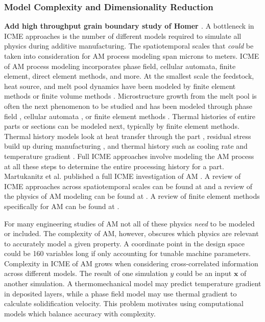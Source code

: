 \subsubsection{Model Complexity and Dimensionality Reduction}
\textbf{Add high throughput grain boundary study of Homer \cite{Homer2019}}. 
A bottleneck in ICME approaches is the number of different models required to simulate all physics during additive manufacturing. The spatiotemporal scales that \textit{could} be taken into consideration for AM process modeling span microns to meters. ICME of AM process modeling incorporates phase field, cellular automata, finite element, direct element methods, and more. At the smallest scale the feedstock, heat source, and melt pool dynamics have been modeled by finite element methods \cite{Toyserkani2004, Khairallah2016, Manvatkar2014} or finite  volume methods \cite{Dai2014}. Microstructure growth from the melt pool is often the next phenomenon to be studied and has been modeled through phase field \cite{Chen2002, Gong2015, Kundin2015, Sahoo2016}, cellular automata \cite{Tan2011}, or finite element methods \cite{Nie2014}. Thermal histories of entire parts or sections can be modeled next, typically by finite element methods. Thermal history models look at heat transfer through the part \cite{Michaleris2014}, residual stress build up during manufacturing \cite{Pal2014, Ding2011}, and thermal history such as cooling rate and temperature gradient \cite{Li2014, Raghavan2016}. Full ICME approaches involve modeling the AM process at all these steps to determine the entire processing history for a part. Martukanitz et al. published a full ICME investigation of AM \cite{Martukanitz2014}. A review of ICME approaches across spatiotemporal scales can be found at \cite{Francois2017} and a review of the physics of AM modeling can be found at \cite{King2015a}. A review of finite element methods specifically for AM can be found at \cite{Gouge2018}. 

For many engineering studies of AM not all of these physics \textit{need} to be modeled or included. The complexity of AM, however, obscures which physics are relevant to accurately model a given property. A coordinate point in the design space could be 160 variables long if only accounting for tunable machine parameters. Complexity in ICME of AM grows when considering cross-correlated information across different models. The result of one simulation $y$ could be an input $\mathbf{x}$ of another simulation. A thermomechanical model may predict temperature gradient in deposited layers, while a phase field model may use thermal gradient to calculate solidification velocity. This problem motivates using computational models which balance accuracy with complexity.

